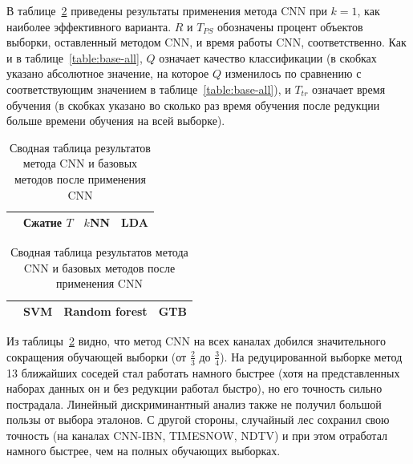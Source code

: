 В таблице~\ref{table:cnn-results} приведены результаты применения метода CNN при \(k=1\), как наиболее эффективного варианта. \(R\) и \(T_{PS}\) обозначены процент объектов выборки, оставленный методом CNN, и время работы CNN, соответственно. Как и в таблице~\ref{table:base-all}, \(Q\) означает качество классификации (в скобках указано абсолютное значение, на которое \(Q\) изменилось по сравнению с соответствующим значением в таблице~\ref{table:base-all}), и \(T_{tr}\) означает время обучения (в скобках указано во сколько раз время обучения после редукции больше времени обучения на всей выборке).
\begin{table}[h!]
    \centering
    \begin{tabular}{|c||c||c|c|}
    \cline{2-4}
    \multicolumn{1}{c||}{} & Сжатие \(T\) & \(k\)NN & LDA \\
    \hline \hline
	
\end{tabular}
\newline \vspace*{0.5cm} \newline
\begin{tabular}{|c||c|c|c|}
    \cline{2-4}
    \multicolumn{1}{c||}{} & SVM & Random forest & GTB \\
    \hline \hline
	
    \end{tabular}
    \caption{Сводная таблица результатов метода CNN и базовых методов после применения CNN}
    \label{table:cnn-results}
\end{table}

 Из таблицы~\ref{table:cnn-results} видно, что метод CNN на всех каналах добился значительного сокращения обучающей выборки (от \(\frac23\) до \(\frac34\)). На редуцированной выборке метод 13 ближайших соседей стал работать намного быстрее (хотя на представленных наборах данных он и без редукции работал быстро), но его точность сильно пострадала. Линейный дискриминантный анализ также не получил большой пользы от выбора эталонов. С другой стороны, случайный лес сохранил свою точность (на каналах CNN-IBN, TIMESNOW, NDTV) и при этом отработал намного быстрее, чем на полных обучающих выборках.

